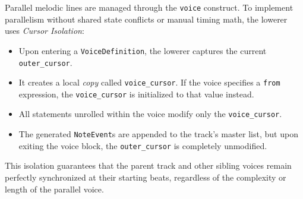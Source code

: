 Parallel melodic lines are managed through the \texttt{voice} construct.
To implement parallelism without shared state conflicts or manual timing math, the lowerer uses \textit{Cursor Isolation}:
\begin{itemize}
    \item Upon entering a \texttt{VoiceDefinition}, the lowerer captures the current \texttt{outer\_cursor}.
    \item It creates a local \textit{copy} called \texttt{voice\_cursor}. If the voice specifies a \texttt{from} expression, the \texttt{voice\_cursor} is initialized to that value instead.
    \item All statements unrolled within the voice modify only the \texttt{voice\_cursor}.
    \item The generated \texttt{NoteEvent}s are appended to the track's master list, but upon exiting the voice block, the \texttt{outer\_cursor} is completely unmodified.
\end{itemize}
This isolation guarantees that the parent track and other sibling voices remain perfectly synchronized at their starting beats, regardless of the complexity or length of the parallel voice.
